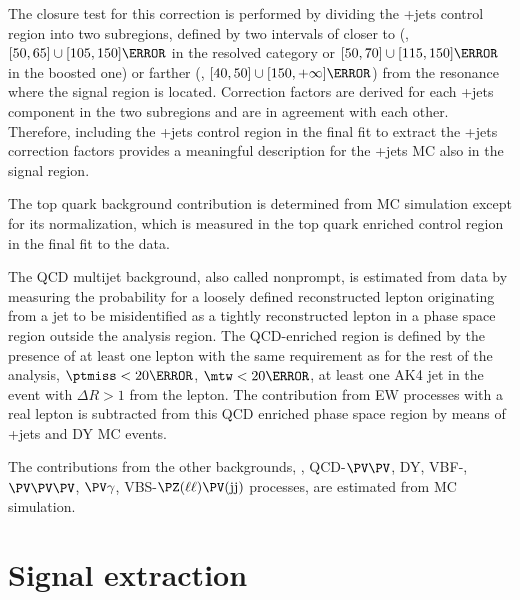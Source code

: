 The closure test for this correction is performed by dividing the {\PW}+jets control region into two subregions, defined
by two intervals of \mvhad closer to (\ie, $[50,65] \cup [105,150] \GeV$ in the resolved category or $[50,70] \cup
[115,150] \GeV$ in the boosted one) or farther (\ie, $[40, 50] \cup [150,+\infty] \GeV$) from the {\PV} resonance where
the signal region is located.  Correction factors are derived for each {\PW}+jets component in the two subregions and
are in agreement with each other. Therefore, including the {\PW}+jets control region in the final fit to extract the
{\PW}+jets correction factors provides a meaningful description for the {\PW}+jets MC also in the signal region.

The top quark background contribution is determined from MC simulation except for its normalization, which is measured
in the top quark enriched control region in the final fit to the data.

The QCD multijet background, also called nonprompt, is estimated from data by measuring the probability for a loosely
defined reconstructed lepton originating from a jet to be misidentified as a tightly reconstructed lepton in a phase
space region outside the analysis region. The QCD-enriched region is defined by the presence of at least one lepton with
the same \pt requirement as for the rest of the analysis, $\ptmiss < 20\GeV$, $\mtw < 20\GeV$, at least one AK4 jet in
the event with $\Delta R>1$ from the lepton.  The contribution
from EW processes with a real lepton is subtracted from this QCD enriched phase space region by means of {\PW}+jets and
DY MC events.
 
The contributions from the other backgrounds, \eg, QCD-$\PV\PV$, DY, VBF-{\PV}, $\PV\PV\PV$, $\PV\gamma$,
VBS-$\PZ(\ell\ell)\PV(\mathrm{jj})$ processes, are estimated from MC simulation.


\section{Signal extraction}\label{sec:6}

